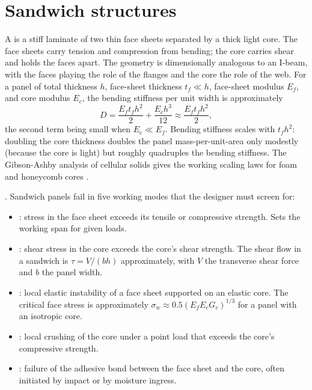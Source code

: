 \section{Sandwich structures}

A  is a stiff laminate of two thin face sheets
separated by a thick light core. The face sheets carry tension and
compression from bending; the core carries shear and holds the faces
apart. The geometry is dimensionally analogous to an I-beam, with the
faces playing the role of the flanges and the core the role of the
web. For a panel of total thickness $h$, face-sheet thickness $t_f
\ll h$, face-sheet modulus $E_f$, and core modulus $E_c$, the bending
stiffness per unit width is approximately
\[
D = \frac{E_f t_f h^2}{2} + \frac{E_c h^3}{12} \approx
\frac{E_f t_f h^2}{2},
\]
the second term being small when $E_c \ll E_f$. Bending stiffness
scales with $t_f h^2$: doubling the core thickness doubles the panel
mass-per-unit-area only modestly (because the core is light) but
roughly quadruples the bending stiffness. The Gibson-Ashby analysis
of cellular solids gives the working scaling laws for foam and
honeycomb cores \cite[ch.~4]{text:gibson-ashby-cellular}.

. Sandwich panels fail in five working
modes that the designer must screen for:
\begin{itemize}[leftmargin=*]
\item {}: stress in the face sheet
  exceeds its tensile or compressive strength. Sets the working span
  for given loads.
\item {}: shear stress in the core exceeds
  the core's shear strength. The shear flow in a sandwich is
  $\tau = V / (b h)$ approximately, with $V$ the transverse shear
  force and $b$ the panel width.
\item {}: local elastic instability of a face
  sheet supported on an elastic core. The critical face stress is
  approximately $\sigma_{w} \approx 0.5 (E_f E_c G_c)^{1/3}$ for a
  panel with an isotropic core.
\item {}: local
  crushing of the core under a point load that exceeds the core's
  compressive strength.
\item {}: failure of the adhesive bond
  between the face sheet and the core, often initiated by impact or
  by moisture ingress.
\end{itemize}

